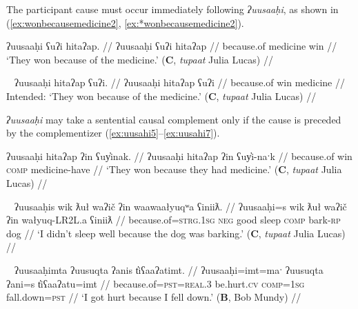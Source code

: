 The participant cause must occur immediately following \textit{ʔuusaaḥi}, as shown in (\ref{ex:wonbecausemedicine2}, \ref{ex:*wonbecausemedicine2}).

\ex \label{ex:wonbecausemedicine2}
\begingl
\glpreamble ʔuusaaḥi ʕuʔi hitaʔap. //
\gla ʔuusaaḥi ʕuʔi hitaʔap //
\glb because.of medicine win //
\glft `They won because of the medicine.' (\textbf{C}, \textit{tupaat} Julia Lucas) //
\endgl
\xe

\ex~ \label{ex:*wonbecausemedicine2}
\begingl
\glpreamble *ʔuusaaḥi hitaʔap ʕuʔi. //
\gla ʔuusaaḥi hitaʔap ʕuʔi //
\glb because.of win medicine //
\glft Intended: `They won because of the medicine.' (\textbf{C}, \textit{tupaat} Julia Lucas) //
\endgl
\xe

\textit{ʔuusaaḥi} may take a sentential causal complement only if the cause is preceded by the complementizer (\ref{ex:uusahi5}--\ref{ex:uusahi7}).

\ex \label{ex:uusahi5}
\begingl
\glpreamble ʔuusaaḥi hitaʔap ʔin ʕuy̓inak. //
\gla ʔuusaaḥi hitaʔap ʔin ʕuy̓i-naˑk //
\glb because.of win \textsc{comp} medicine-have  //
\glft `They won because they had medicine.' (\textbf{C}, \textit{tupaat} Julia Lucas) //
\endgl
\xe

\ex~ \label{ex:uusahi6}
\begingl
\glpreamble ʔuusaaḥis wik ƛuł waʔič ʔin waawaałyuqʷa ʕiniiƛ. //
\gla ʔuusaaḥi=s wik ƛuł waʔič ʔin wałyuq-LR2L.a ʕiniiƛ //
\glb because.of=\textsc{strg.1sg} \textsc{neg} good sleep \textsc{comp} bark-\textsc{rp} dog  //
\glft `I didn't sleep well because the dog was barking.' (\textbf{C}, \textit{tupaat} Julia Lucas) //
\endgl
\xe

\ex~ \label{ex:uusahi7}
\begingl
\glpreamble ʔuusaaḥimta ʔuusuqta ʔanis t̓iʕaaʔatimt. //
\gla ʔuusaaḥi=imt=maˑ ʔuusuqta ʔani=s t̓iʕaaʔatu=imt //
\glb because.of=\textsc{pst}=\textsc{real.3} be.hurt.\textsc{cv} \textsc{comp}=\textsc{1sg} fall.down=\textsc{pst}  //
\glft `I got hurt because I fell down.' (\textbf{B}, Bob Mundy) //
\endgl
\xe

\begin{comment}
[[uusahi plus linker ]]
\textit{ʔuusaaḥi} may only be able to take the linker when it is non-initial. Both consultants with whom I attempted to add a linker to an ʔuusaaḥi-initial sentence were uncertain if it was okay or not but felt it was weird (\ref{ex:uusahi7}, \ref{ex:uusahi8}).

\ex \label{ex:uusahi7}
\begingl
\glpreamble ?? ʔuusaaḥiqḥita nay̓aqakʔi wikitaḥ ƛuł weʔič. //
\gla ʔuusaaḥi-(q)ḥ=(m)it=(m)aˑ nay̓aqak=ʔiˑ wik=(m)it=(m)aˑḥ ƛuł weʔič //
\glb because.of-\textsc{link}=\textsc{pst}=\textsc{real.3} baby=\textsc{art} \textsc{neg}=\textsc{pst}=\textsc{real.1sg} good sleep //
\glft Intended: `I didn't sleep well because of the baby.' (\textbf{B}, Bob Mundy) //
\endgl
\xe

*? ʔuusaaḥiqḥʔiš ʔuusaqta wik̓aałukʷint

ʔuusaqtumtʔiš ʔuusaaḥiqḥ wik̓aałukʷint
\end{comment}

